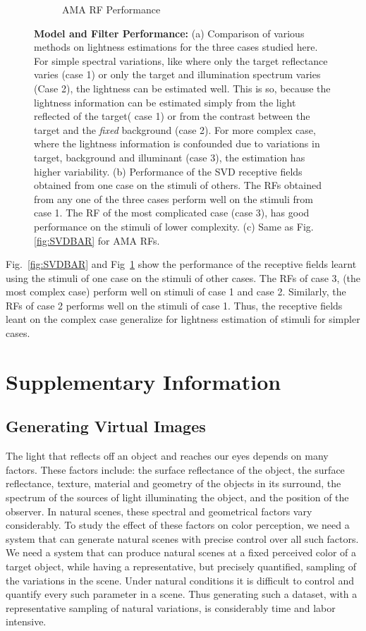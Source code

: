 \documentclass{jov}
\begin{document}
\begin{figure}
\begin{subfigure}{0.3 \textwidth}
	\caption{AMA RF Performance}
	\label{fig:AMABAR}
    \end{subfigure}
\caption{{\bf Model and Filter Performance:} (a) Comparison of various methods on lightness estimations for the three cases studied here. For simple spectral variations, like where only the target reflectance varies (case 1) or only the target and illumination spectrum varies (Case 2), the lightness can be estimated well. This is so, because the lightness information can be estimated simply from the light reflected of the target( case 1) or from the contrast between the target and the {\it fixed} background (case 2). For more complex case, where the lightness information is confounded due to variations in target, background and illuminant (case 3), the estimation has higher variability. (b) Performance of the SVD receptive fields obtained from one case on the stimuli of others. The RFs obtained from any one of the three cases perform well on the stimuli from case 1. The RF of the most complicated case (case 3), has good performance on the stimuli of lower complexity. (c) Same as Fig.\ref{fig:SVDBAR} for AMA RFs.}
 \label{fig:barGraphs}
\end{figure}
Fig.~\ref{fig:SVDBAR} and Fig~\ref{fig:AMABAR} show the performance of the receptive fields learnt using the stimuli of one case on the stimuli of other cases. The RFs of case 3, (the most complex case) perform well on stimuli of case 1 and case 2.  Similarly, the RFs of case 2 performs well on the stimuli of case 1. Thus, the receptive fields leant on the complex case generalize for lightness estimation of stimuli for simpler cases.

\section{Supplementary Information}
\subsection{Generating Virtual Images}
The light that reflects off an object and reaches our eyes depends on many factors. These factors include: the surface reflectance of the object, the surface reflectance, texture, material and geometry of the objects in its surround, the spectrum of the sources of light illuminating the object, and the position of the observer. In natural scenes, these spectral and geometrical factors vary considerably. To study the effect of these factors on color perception, we need a system that can generate natural scenes with precise control over all such factors. We need a system that can produce natural scenes at a fixed perceived color of a target object, while having a representative, but precisely quantified, sampling of the variations in the scene. Under natural conditions it is difficult to control and quantify every such parameter in a scene. Thus generating such a dataset, with a representative sampling of natural variations, is considerably time and labor intensive.
\end{document}
